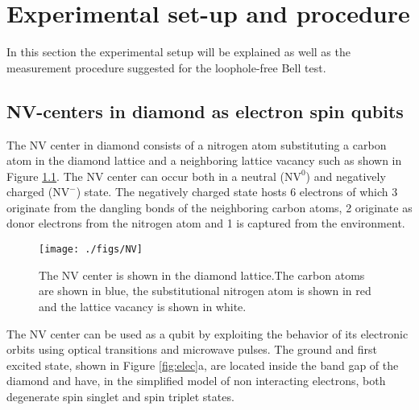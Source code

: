 \color{tudelft-cyan}
\chapter{Experimental set-up and procedure}
\label{expset}
\color{black}


In this section the experimental setup will be explained as well as the measurement procedure suggested for the loophole-free Bell test. 


\color{tudelft-cyan}
\section{NV-centers in diamond as electron spin qubits}
\color{black}
The NV center in diamond consists of a nitrogen atom substituting a carbon atom in the diamond lattice and a neighboring lattice vacancy such as shown in Figure \ref{fig:NV}. The NV center can occur both in a neutral ($\mathrm{NV^0}$) and negatively charged ($\mathrm{NV^-}$) state. The negatively charged state hosts 6 electrons of which 3 originate from the dangling bonds of the neighboring carbon atoms, 2 originate as donor electrons from the nitrogen atom and 1 is captured from the environment.

\begin{figure}[h!]\centering
\texttt{[image: ./figs/NV]}
\caption{The NV center is shown in the diamond lattice.The carbon atoms are shown in blue, the substitutional nitrogen atom is shown in red and the lattice vacancy is shown in white.}
\label{fig:NV}
\end{figure}

The NV center can be used as a qubit by exploiting the behavior of its electronic orbits using optical transitions and microwave pulses. The ground and first excited state, shown in Figure \ref{fig:elec}a, are located inside the band gap of the diamond and have, in the simplified model of non interacting electrons, both degenerate spin singlet and spin triplet states. 

